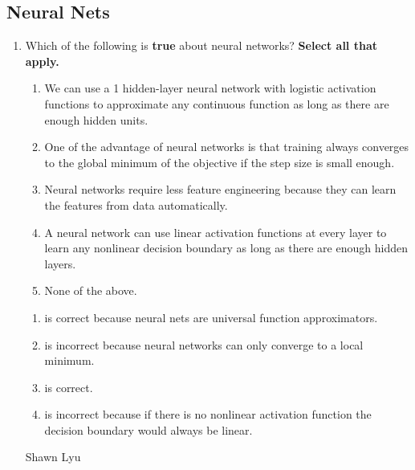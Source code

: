 \subsection{Neural Nets}

\begin{enumerate}

    \item{} Which of the following is \textbf{true} about neural networks?
    \textbf{Select all that apply.}
    \begin{enumerate}
        \item We can use a 1 hidden-layer neural network with logistic activation functions to approximate any continuous function as long as there are enough hidden units.
        \item One of the advantage of neural networks is that training always converges to the global minimum  of the objective if the step size is small enough.
        \item Neural networks require less feature engineering because they can learn the features from data automatically.
        \item A neural network can use linear activation functions at every layer to learn any nonlinear decision boundary as long as there are enough hidden layers. 
        \item None of the above.
    \end{enumerate}
    
    \begin{soln}
    \begin{enumerate}
        \item is correct because neural nets are universal function approximators.
        \item is incorrect because neural networks can only converge to a local minimum.
        \item is correct.        
        \item is incorrect because if there is no nonlinear activation function the decision boundary would always be linear.
    \end{enumerate}
    \end{soln}
    
    \begin{qauthor}
    Shawn Lyu
    \end{qauthor}

\end{enumerate}